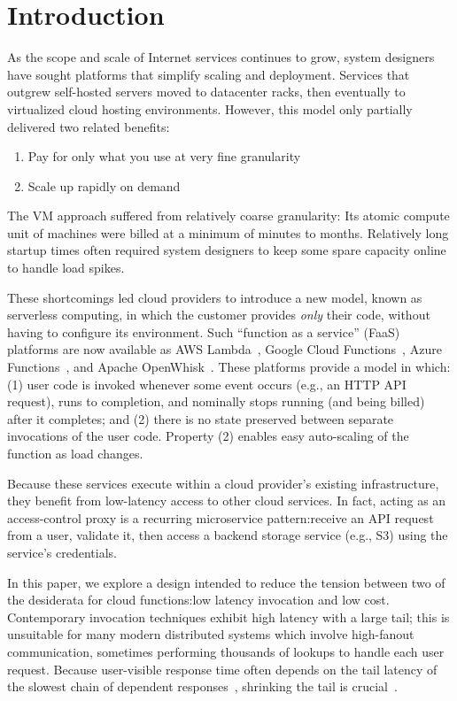 \section{Introduction}
\label{sec:intro}

As the scope and scale of Internet services continues to grow, system designers
have sought platforms that simplify scaling and deployment.
Services that outgrew self-hosted servers moved to datacenter racks, then
eventually to virtualized cloud hosting environments.
However, this model only partially delivered two related benefits:
\begin{enumerate}
\item Pay for only what you use at very fine granularity
\item Scale up rapidly on demand
\end{enumerate}

\noindent
The VM approach suffered from relatively coarse granularity:  Its atomic compute unit
of machines were billed at a minimum of minutes to months.  Relatively long startup
times often required system designers to keep some spare capacity online to handle
load spikes.

These shortcomings led cloud providers to introduce a new model, known as
serverless computing, in which the customer provides \textit{only} their code,
without having to configure its environment.   Such ``function as a service''
(FaaS) platforms are now available as AWS Lambda~\cite{www-amazon-lambda}, Google
Cloud Functions~\cite{www-google-cf}, Azure Functions~\cite{www-microsoft-af}, and
Apache OpenWhisk~\cite{www-apache-openwhisk}.  These platforms provide a model in
which: (1)  user code is invoked whenever some event occurs (e.g., an HTTP
API request), runs to completion, and nominally stops running (and being
billed) after it completes; and (2)  there is no state preserved between
separate invocations of the user code.  Property (2) enables easy auto-scaling
of the function as load changes.

Because these services execute within a cloud provider's existing
infrastructure, they benefit from low-latency access to other cloud
services.  In fact, acting as an access-control proxy is a recurring microservice
pattern:\@ receive an API request from a user, validate it, then access
a backend storage service (e.g., S3) using the service's credentials.

In this paper, we explore a design intended to reduce the tension between two of
the desiderata for cloud functions:\@ low latency invocation and low cost.  Contemporary
invocation techniques exhibit high latency with a
large tail; this is
unsuitable for many modern distributed systems which involve
high-fanout communication, sometimes performing thousands of
lookups to handle each user request.  Because user-visible response time often
depends on the tail latency of the slowest chain of dependent
responses~\cite{Dean:cacm2013}, shrinking the tail is crucial~\cite{Jalaparti:sigcomm2013,
Xu:nsdi2013,Li:socc2014,Jeon:asplos2016}.


